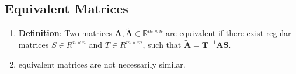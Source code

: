\subsection{Equivalent Matrices}

\begin{enumerate}
    \item \textbf{Definition}: Two matrices $\bm{A}, \tilde{\bm{A}} \in \mathbb{R}^{m\times n}$ are equivalent if there exist regular matrices $S \in R^{n\times n}$ and $T \in R^{m\times m}$, such that $\tilde{\bm{A}} = \bm{T} ^{-1}\bm{AS}$.
    \hfill \cite{mfml/book/mml/Deisenroth-Faisal-Ong}

    \item equivalent matrices are not necessarily similar. 
    \hfill \cite{mfml/book/mml/Deisenroth-Faisal-Ong}
\end{enumerate}














